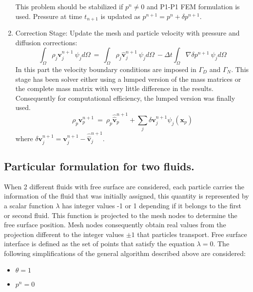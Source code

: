 \begin{enumerate}
 This problem should be stabilized if $p^n\neq0$ and P1-P1 FEM formulation is used. Pressure at time $t_{n+1}$ is updated as $p^{n+1}=p^{n}+\delta p^{n+1}$.


 \item Correction Stage: Update the mesh and particle velocity with pressure and diffusion corrections:
 \begin{equation}\label{Step6a}
  \int_{\Omega} \rho_j \mathbf{v}_j^{n+1}\ \psi_j d\Omega \ = \ \int_{\Omega} \rho_j  \widehat{\mathbf{v}}_j^{n+1}\ \psi_j d\Omega\ - \Delta t \int_{\Omega}  \nabla \delta p^{n+1}\ \psi_j d\Omega
 \end{equation}
 In this part the velocity boundary conditions are imposed in $\Gamma_D$ and $\Gamma_N$. This stage has been solver either using a lumped version of the mass matrices or the complete mass matrix with very little difference in the results. Consequently for computational efficiency, the lumped version was finally used.
  \begin{equation}\label{Step6b}
  \rho_p \mathbf{v}_p^{n+1}\  = \ \rho_p \widehat{\widehat{\mathbf{v}}}_p^{n+1} + \sum_{j} \delta \mathbf{v}_j^{n+1} \psi_j(\mathbf{x}_{p})
  \end{equation}
  where $\delta \mathbf{v}_j^{n+1} = \mathbf{v}_j^{n+1}-\widehat{\widehat{\mathbf{v}}}_j^{n+1}$.

\end{enumerate}

\subsection{Particular formulation for two fluids.}
When 2 different fluids with free surface are considered, each particle carries the information of the fluid that was initially assigned, this quantity is represented by a scalar function $\lambda$ has integer values -1 or 1 depending if it belongs to the first or second fluid. This function is projected to the mesh nodes to determine the free surface position. Mesh nodes consequently obtain real values from the projection different to the integer values $\pm1$ that particles transport. Free surface interface is defined as the set of points that satisfy the equation $\lambda=0$. The following simplifications of the general algorithm described above are considered:

\begin{itemize}
  \item $\theta=1$
  \item $p^n=0$
\end{itemize}

